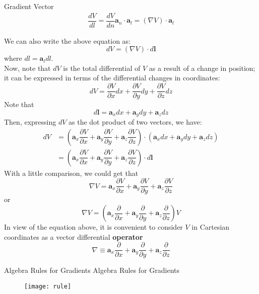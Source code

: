 \documentclass[10pt]{beamer}
\begin{document}
\begin{frame}[allowframebreaks]{ Gradient Vector}
	\begin{align*}
	\dfrac{dV}{dl} = \dfrac{dV}{dn}\mathbf{a}_n\cdot\mathbf{a}_l = (\nabla V)\cdot \mathbf{a}_l
	\end{align*}

We can also write the above equation as:
$$dV = (\nabla V)\cdot d\mathbf{l}$$
where $dl = \mathbf{a}_ldl$. 
\\Now, note that $dV$ is the total differential of $V$ as a result of
a change in position; it can be expressed in terms of
the differential changes in coordinates:
$$dV = \dfrac{\partial V}{\partial x}dx + \dfrac{\partial V}{\partial y}dy + \dfrac{\partial V}{\partial z}dz$$
Note that $$d\mathbf{l} = \mathbf{a}_xdx + \mathbf{a}_ydy + \mathbf{a}_zdz$$
Then, expressing $dV$ as the dot product of two vectors, we have:
\begin{align*}
dV &=  \left(\mathbf{a}_x\dfrac{\partial V}{\partial x} + \mathbf{a}_y\dfrac{\partial V}{\partial y} + \mathbf{a}_z\dfrac{\partial V}{\partial z}\right)  \cdot\left(\mathbf{a}_xdx + \mathbf{a}_ydy + \mathbf{a}_zdz\right)
\\&=\left(\mathbf{a}_x\dfrac{\partial V}{\partial x} + \mathbf{a}_y\dfrac{\partial V}{\partial y} + \mathbf{a}_z\dfrac{\partial V}{\partial z}\right) \cdot d\mathbf{l}
\end{align*}
With a little comparison, we could get that 
$$\nabla V = \mathbf{a}_x\dfrac{\partial V}{\partial x} + \mathbf{a}_y\dfrac{\partial V}{\partial y} + \mathbf{a}_z\dfrac{\partial V}{\partial z}$$
or
$$\nabla V = \left(\mathbf{a}_x\dfrac{\partial }{\partial x} + \mathbf{a}_y\dfrac{\partial }{\partial y} + \mathbf{a}_z\dfrac{\partial }{\partial z}\right) V$$
In view of the equation above, it is convenient to consider $V$ in Cartesian coordinates as a
vector differential {\bfseries\color{red}operator}
$$\nabla \equiv \mathbf{a}_x\dfrac{\partial }{\partial x} + \mathbf{a}_y\dfrac{\partial }{\partial y} + \mathbf{a}_z\dfrac{\partial }{\partial z}$$
\end{frame}


\begin{frame}[allowframebreaks]{ Algebra Rules for Gradients}
Algebra Rules for Gradients
\begin{figure}[H]
	\centering
	\texttt{[image: rule]}
\end{figure}

\end{frame}
\end{document}
